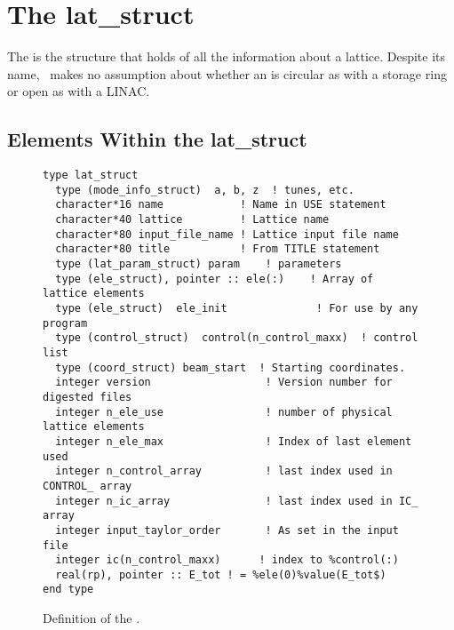 \chapter{The lat_struct}
\label{c:lat_struct}

The  is the structure that holds of all the information 
about a lattice.   Despite its name, \bmad\
makes no assumption about whether an  is circular as
with a storage ring or open as with a LINAC.

\section{Elements Within the lat_struct}
\label {s:lat_struct}

\begin{figure}[htb]
\centering
\begin{verbatim}
type lat_struct
  type (mode_info_struct)  a, b, z  ! tunes, etc.
  character*16 name            ! Name in USE statement
  character*40 lattice         ! Lattice name
  character*80 input_file_name ! Lattice input file name
  character*80 title           ! From TITLE statement
  type (lat_param_struct) param    ! parameters
  type (ele_struct), pointer :: ele(:)    ! Array of lattice elements
  type (ele_struct)  ele_init              ! For use by any program
  type (control_struct)  control(n_control_maxx)  ! control list
  type (coord_struct) beam_start  ! Starting coordinates.
  integer version                  ! Version number for digested files
  integer n_ele_use                ! number of physical lattice elements
  integer n_ele_max                ! Index of last element used
  integer n_control_array          ! last index used in CONTROL_ array
  integer n_ic_array               ! last index used in IC_ array
  integer input_taylor_order       ! As set in the input file
  integer ic(n_control_maxx)      ! index to %control(:)
  real(rp), pointer :: E_tot ! = %ele(0)%value(E_tot$)
end type
\end{verbatim}
\caption{Definition of the .}
\label{f:lat_struct}
\end{figure}

